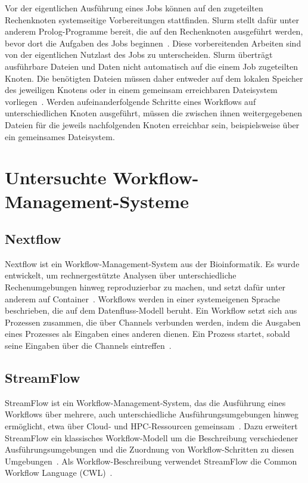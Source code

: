 Vor der eigentlichen Ausführung eines Jobs können auf den
zugeteilten Rechenknoten systemseitige Vorbereitungen stattfinden.
Slurm stellt dafür unter anderem Prolog-Programme bereit, die auf
den Rechenknoten ausgeführt werden, bevor dort die Aufgaben des
Jobs beginnen~\cite{slurmdocs-prolog}. Diese vorbereitenden
Arbeiten sind von der eigentlichen Nutzlast des Jobs zu
unterscheiden. Slurm überträgt ausführbare Dateien und Daten nicht
automatisch auf die einem Job zugeteilten Knoten. Die benötigten
Dateien müssen daher entweder auf dem lokalen Speicher des
jeweiligen Knotens oder in einem gemeinsam erreichbaren
Dateisystem vorliegen~\cite{slurmdocs-quickstart}. Werden
aufeinanderfolgende Schritte eines Workflows auf unterschiedlichen
Knoten ausgeführt, müssen die zwischen ihnen weitergegebenen
Dateien für die jeweils nachfolgenden Knoten erreichbar sein,
beispielsweise über ein gemeinsames Dateisystem.

\section{Untersuchte Workflow-Management-Systeme}
\label{sec:basics:systeme}


\subsection{Nextflow}
\label{sec:basics:nextflow}
Nextflow ist ein Workflow-Management-System aus der Bioinformatik.
Es wurde entwickelt, um rechnergestützte Analysen über
unterschiedliche Rechenumgebungen hinweg reproduzierbar zu machen,
und setzt dafür unter anderem auf
Container~\cite[S.~316]{ditommaso2017nextflow}. Workflows werden in
einer systemeigenen Sprache beschrieben, die auf dem
Datenfluss-Modell beruht. Ein Workflow setzt sich aus Prozessen
zusammen, die über Channels verbunden werden, indem die Ausgaben
eines Prozesses als Eingaben eines anderen dienen. Ein Prozess
startet, sobald seine Eingaben über die Channels
eintreffen~\cite[S.~317]{ditommaso2017nextflow}.


\subsection{StreamFlow}
\label{sec:basics:streamflow}
StreamFlow ist ein Workflow-Management-System, das die Ausführung
eines Workflows über mehrere, auch unterschiedliche Ausführungsumgebungen hinweg ermöglicht, etwa über Cloud- und HPC-Ressourcen gemeinsam~\cite[S.~1723]{colonnelli2021streamflow}. Dazu erweitert StreamFlow ein klassisches Workflow-Modell um die Beschreibung verschiedener Ausführungsumgebungen und die Zuordnung von Workflow-Schritten zu diesen Umgebungen~\cite[S.~1723]{colonnelli2021streamflow}. Als Workflow-Beschreibung verwendet StreamFlow die Common Workflow Language (CWL)~\cite[S.~1723]{colonnelli2021streamflow}.

